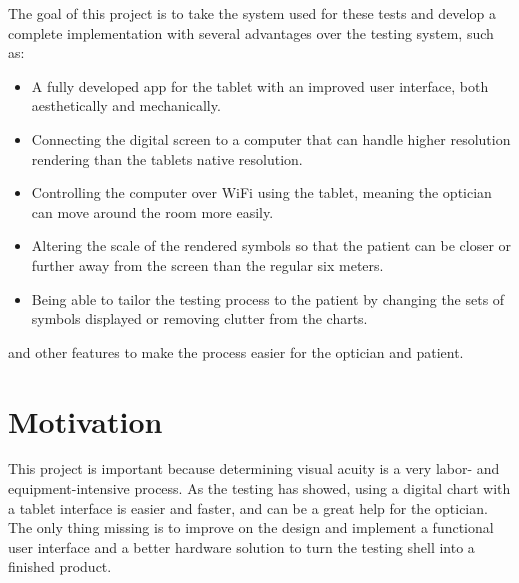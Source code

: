 \documentclass[12pt,a4paper,notitlepage]{report}
\begin{document}
The goal of this project is to take the system used for these tests and develop a complete implementation with several advantages over the testing system, such as:

\begin{itemize}
	\item A fully developed app for the tablet with an improved user interface, both aesthetically and mechanically.
	\item Connecting the digital screen to a computer that can handle higher resolution rendering than the tablets native resolution.
	\item Controlling the computer over WiFi using the tablet, meaning the optician can move around the room more easily.
	\item Altering the scale of the rendered symbols so that the patient can be closer or further away from the screen than the regular six meters.
	\item Being able to tailor the testing process to the patient by changing the sets of symbols displayed or removing clutter from the charts.
\end{itemize}
	
and other features to make the process easier for the optician and patient.




\section{Motivation}

This project is important because determining visual acuity is a very labor- and equipment-intensive process. As the testing has showed, using a digital chart with a tablet interface is easier and faster, and can be a great help for the optician. The only thing missing is to improve on the design and implement a functional user interface and a better hardware solution to turn the testing shell into a finished product. 

\end{document}
